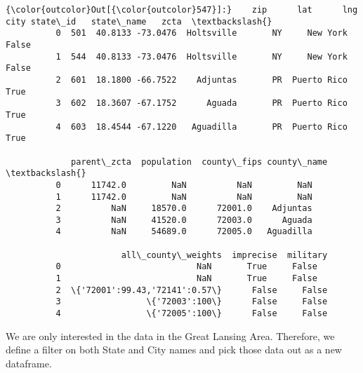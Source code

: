 \documentclass[11pt]{article}
\begin{document}
\begin{Verbatim}[commandchars=\\\{\}]
{\color{outcolor}Out[{\color{outcolor}547}]:}    zip      lat      lng        city state\_id   state\_name   zcta  \textbackslash{}
          0  501  40.8133 -73.0476  Holtsville       NY     New York  False   
          1  544  40.8133 -73.0476  Holtsville       NY     New York  False   
          2  601  18.1800 -66.7522    Adjuntas       PR  Puerto Rico   True   
          3  602  18.3607 -67.1752      Aguada       PR  Puerto Rico   True   
          4  603  18.4544 -67.1220   Aguadilla       PR  Puerto Rico   True   
          
             parent\_zcta  population  county\_fips county\_name  \textbackslash{}
          0      11742.0         NaN          NaN         NaN   
          1      11742.0         NaN          NaN         NaN   
          2          NaN     18570.0      72001.0    Adjuntas   
          3          NaN     41520.0      72003.0      Aguada   
          4          NaN     54689.0      72005.0   Aguadilla   
          
                       all\_county\_weights  imprecise  military  
          0                           NaN       True     False  
          1                           NaN       True     False  
          2  \{'72001':99.43,'72141':0.57\}      False     False  
          3                 \{'72003':100\}      False     False  
          4                 \{'72005':100\}      False     False  
\end{Verbatim}
            
    We are only interested in the data in the Great Lansing Area. Therefore,
we define a filter on both State and City names and pick those data out
as a new dataframe.
\end{document}
